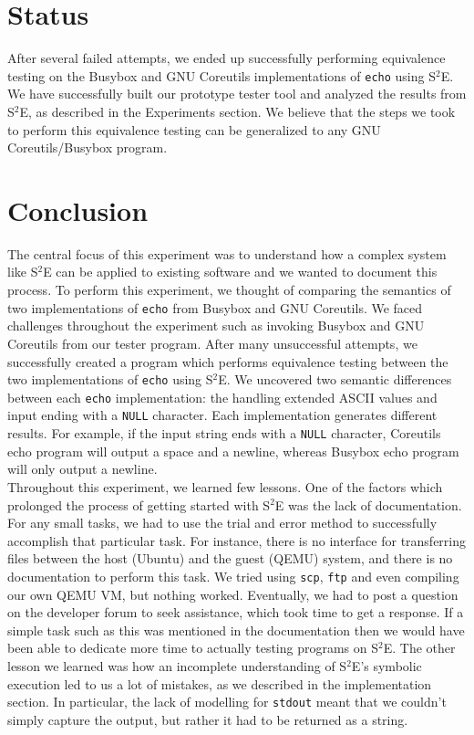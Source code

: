 \documentclass[conference]{IEEEtran}
\begin{document}

\section{Status}

After several failed attempts, we ended up successfully performing equivalence testing on the Busybox and GNU Coreutils implementations of {\tt echo} using S$^2$E. We have successfully built our prototype tester tool and analyzed the results from S$^2$E, as described in the Experiments section. We believe that the steps we took to perform this equivalence testing can be generalized to any GNU Coreutils/Busybox program. 


\section{Conclusion}

The central focus of this experiment was to understand how a complex system like S$^2$E can be applied to existing software and we wanted to document this process. To perform this experiment, we thought of comparing the semantics of two implementations of {\tt echo} from Busybox and GNU Coreutils. We faced challenges throughout the experiment such as invoking Busybox and GNU Coreutils from our tester program. After many unsuccessful attempts, we successfully created a program which performs equivalence testing between the two implementations of {\tt echo} using S$^2$E. We uncovered two semantic differences between each {\tt echo} implementation: the handling extended ASCII values and input ending with a {\tt NULL} character. Each implementation generates different results. For example, if the input string ends with  a {\tt NULL} character, Coreutils echo program will output a space and a newline, whereas Busybox echo program will only output a newline. \\

Throughout this experiment, we learned few lessons. One of the factors which prolonged the process of getting started with S$^2$E was the lack of documentation. For any small tasks, we had to use the trial and error method to successfully accomplish that particular task. For instance, there is no interface for transferring files between the host (Ubuntu) and the guest (QEMU) system, and there is no documentation to perform this task. We tried using {\tt scp}, {\tt ftp} and even compiling our own QEMU VM, but nothing worked. Eventually, we had to post a question on the developer forum to seek assistance, which took time to get a response. If a simple task such as this was mentioned in the documentation then we would have been able to dedicate more time to actually testing programs on S$^2$E. The other lesson we learned was how an incomplete understanding of S$^2$E's symbolic execution led to us a lot of mistakes, as we described in the implementation section. In particular, the lack of modelling for {\tt stdout} meant that we couldn't simply capture the output, but rather it had to be returned as a string. 
\end{document}
